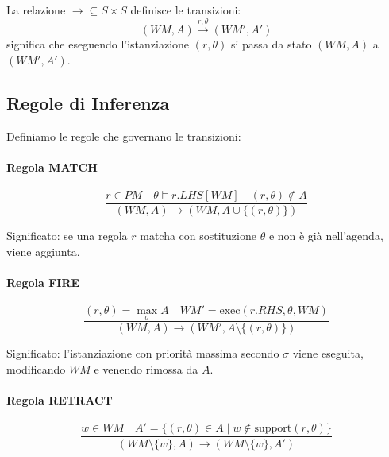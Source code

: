 \begin{definizione}
La relazione $\to \subseteq S \times S$ definisce le transizioni:
\begin{equation}
(WM, A) \xrightarrow{r, \theta} (WM', A')
\end{equation}
significa che eseguendo l'istanziazione $(r, \theta)$ si passa da stato $(WM, A)$ a $(WM', A')$.
\end{definizione}

\subsection{Regole di Inferenza}

Definiamo le regole che governano le transizioni:

\paragraph{Regola MATCH}

\begin{equation}
\frac{
  r \in PM \quad \theta \vDash r.LHS[WM] \quad (r, \theta) \notin A
}{
  (WM, A) \to (WM, A \cup \{(r, \theta)\})
}
\end{equation}

Significato: se una regola $r$ matcha con sostituzione $\theta$ e non è già nell'agenda, viene aggiunta.

\paragraph{Regola FIRE}

\begin{equation}
\frac{
  (r, \theta) = \max_\sigma A \quad WM' = \text{exec}(r.RHS, \theta, WM)
}{
  (WM, A) \to (WM', A \setminus \{(r, \theta)\})
}
\end{equation}

Significato: l'istanziazione con priorità massima secondo $\sigma$ viene eseguita, modificando $WM$ e venendo rimossa da $A$.

\paragraph{Regola RETRACT}

\begin{equation}
\frac{
  w \in WM \quad A' = \{(r, \theta) \in A \mid w \notin \text{support}(r, \theta)\}
}{
  (WM \setminus \{w\}, A) \to (WM \setminus \{w\}, A')
}
\end{equation}

